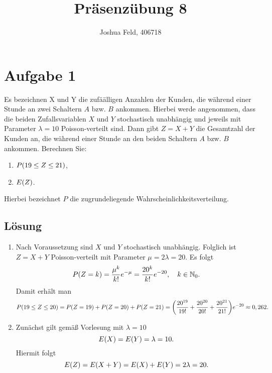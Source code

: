\documentclass{exercise}
\institute{Institut für Statistik und Wirtschaftsmathematik}
\title{Präsenzübung 8}
\author{Joshua Feld, 406718}
\begin{document}
    \maketitle


    \section*{Aufgabe 1}
    
    \begin{problem}
        Es bezeichnen X und Y die zufäälligen Anzahlen der Kunden, die während einer Stunde an zwei Schaltern \(A\) bzw. \(B\) ankommen.
        Hierbei werde angenommen, dass die beiden Zufallsvariablen \(X\) und \(Y\) stochastisch unabhängig und jeweils mit Parameter \(\lambda = 10\) Poisson-verteilt sind.
        Dann gibt \(Z = X + Y\) die Gesamtzahl der Kunden an, die während einer Stunde an den beiden Schaltern \(A\) bzw. \(B\) ankommen.
        Berechnen Sie:
        \begin{enumerate}
            \item \(P\parentheses*{19 \le Z \le 21}\),
            \item \(E\parentheses*{Z}\).
        \end{enumerate}
        Hierbei bezeichnet \(P\) die zugrundeliegende Wahrscheinlichkeitsverteilung.
    \end{problem}
    
    \subsection*{Lösung}
    \begin{enumerate}
        \item Nach Voraussetzung sind \(X\) und \(Y\) stochastisch unabhängig.
        Folglich ist \(Z = X + Y\) Poisson-verteilt mit Parameter \(\mu = 2\lambda = 20\).
        Es folgt
        \[
            P\parentheses*{Z = k} = \frac{\mu^k}{k!}e^{-\mu} = \frac{20^k}{k!}e^{-20}, \quad k \in \N_0.
        \]
        Damit erhält man
        \[
            P\parentheses*{19 \le Z \le 20} = P\parentheses*{Z = 19} + P\parentheses*{Z = 20} + P\parentheses*{Z = 21} = \parentheses*{\frac{20^{19}}{19!} + \frac{20^{20}}{20!} + \frac{20^{21}}{21!}}e^{-20} \approx 0,262.
        \]
        \item Zunächst gilt gemäß Vorlesung mit \(\lambda = 10\)
        \[
            E\parentheses*{X} = E\parentheses*{Y} = \lambda = 10.
        \]
        Hiermit folgt
        \[
            E\parentheses*{Z} = E\parentheses*{X + Y} = E\parentheses*{X} + E\parentheses*{Y} = 2\lambda = 20.
        \]
    \end{enumerate}
\end{document}

